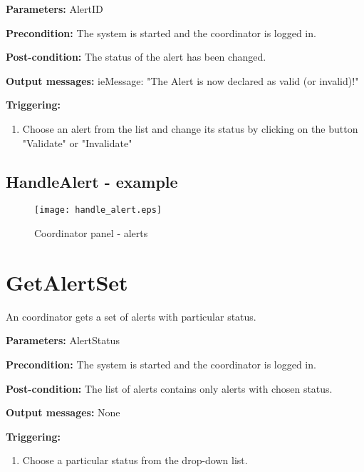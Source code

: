 \begin{description}
	\item \textbf{Parameters:} AlertID 
	\item \textbf{Precondition:} The system is started and the coordinator is
	logged in. 
	\item \textbf{Post-condition:} The status of the alert has been changed.
	\item \textbf{Output messages:} ieMessage: "The Alert is now declared as valid
	(or invalid)!"
	
	\item \textbf{Triggering:}
	
	\begin{enumerate}
		\item Choose an alert from the list and change its status by clicking on the
		button "Validate" or "Invalidate"
	\end{enumerate}
\end{description}

\subsection{HandleAlert - example}

\begin{figure}
    \texttt{[image: handle\_alert.eps]}
	\caption{Coordinator panel - alerts}
\end{figure}

\section{GetAlertSet}
\label{operation:GetAlertSet}

An coordinator gets a set of alerts with particular status.

\begin{description}
	\item \textbf{Parameters:} AlertStatus 
	\item \textbf{Precondition:} The system is started and the coordinator is
	logged in.
	\item \textbf{Post-condition:} The list of alerts contains only alerts with chosen status.
	\item \textbf{Output messages:} None
		
	\item \textbf{Triggering:}
	
	\begin{enumerate}
		\item Choose a particular status from the drop-down list.
	\end{enumerate}
\end{description}

